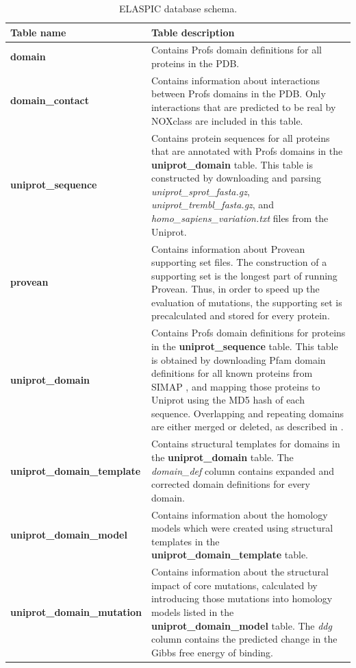\begin{table}[!tb]
\caption[ELASPIC database schema.]{ELASPIC database schema.} \label{tab:elaspic_database_schema}
\begin{tabular}{l | p{10cm}}
	\toprule
	Table name & Table description \\
	\midrule
	\textbf{domain} & Contains Profs domain definitions for all proteins in the PDB. \\
	\textbf{domain\_contact} & Contains information about interactions between Profs domains in the PDB. Only interactions that are predicted to be real by NOXclass \cite{zhu_noxclass:_2006} are included in this table. \\
	\textbf{uniprot\_sequence} & Contains protein sequences for all proteins that are annotated with Profs domains in the \textbf{uniprot\_domain} table. This table is constructed by downloading and parsing \textit{uniprot\_sprot\_fasta.gz}, \textit{uniprot\_trembl\_fasta.gz}, and \textit{homo\_sapiens\_variation.txt} files from the Uniprot. \\
	\textbf{provean} & Contains information about Provean \cite{choi_predicting_2012} supporting set files. The construction of a supporting set is the longest part of running Provean. Thus, in order to speed up the evaluation of mutations, the supporting set is precalculated and stored for every protein. \\
	\textbf{uniprot\_domain} & Contains Profs domain definitions for proteins in the \textbf{uniprot\_sequence} table. This table is obtained by downloading Pfam domain definitions for all known proteins from SIMAP \cite{rattei_simapcomprehensive_2010}, and mapping those proteins to Uniprot using the MD5 hash of each sequence. Overlapping and repeating domains are either merged or deleted, as described in \cite{witvliet_elaspic_2016}. \\
	\textbf{uniprot\_domain\_template} & Contains structural templates for domains in the \textbf{uniprot\_domain} table. The \textit{domain\_def} column contains expanded and corrected domain definitions for every domain. \\
	\textbf{uniprot\_domain\_model} & Contains information about the homology models which were created using structural templates in the \textbf{uniprot\_domain\_template} table. \\
	\textbf{uniprot\_domain\_mutation} & Contains information about the structural impact of core mutations, calculated by introducing those mutations into homology models listed in the \textbf{uniprot\_domain\_model} table. The \textit{ddg} column contains the predicted change in the Gibbs free energy of binding. \\

\end{tabular}
\end{table}
